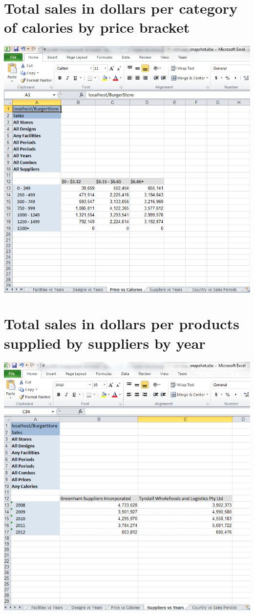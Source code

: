 \documentclass[11pt, a4paper]{article}
\begin{document}
\section{Total sales in dollars per category of calories by price bracket}
\includegraphics[width=15cm]{diagrams/PriceVsCalories}

\section{Total sales in dollars per products supplied by suppliers by year}
\includegraphics[width=15cm]{diagrams/SuppliersVsYears}
\end{document}
